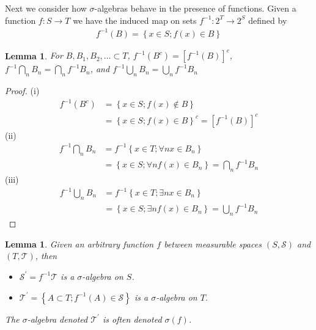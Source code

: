 \documentclass{amsart}
\newtheorem{lem}[thm]{Lemma}
\theoremstyle{remark}
\theoremstyle{definition}
\begin{document}
Next we consider how $\sigma$-algebras behave in the presence of
functions.  Given a function $f:S \to T$ we have the induced map on
sets $f^{-1}: 2^T \to 2^S$ defined by 
\begin{align*}
f^{-1}(B) = \left \{x \in S; f(x) \in B \right \}
\end{align*}
\begin{lem}\label{SetOperationsUnderPullback}For $B,B_1,B_2,\dots \subset T$, $f^{-1}(B^c) = \left[
    f^{-1}(B) \right ]^c$, $f^{-1} \bigcap_n B_n = \bigcap_n f^{-1}
  B_n$, and $f^{-1} \bigcup_n B_n = \bigcup_n f^{-1}
  B_n$
\end{lem}
\begin{proof}
(i)\begin{align*}
f^{-1}(B^c) &= \left \{x \in S; f(x) \notin B \right \} \\
&= \left \{x \in S; f(x) \in B \right \}^c = \left[ f^{-1}(B) \right ]^c
\end{align*}
(ii)\begin{align*}
f^{-1} \bigcap_n B_n &= f^{-1} \left \{x \in T ; \forall n x \in B_n
\right \} \\
& = \left \{x \in S; \forall n f(x) \in B_n \right \} = \bigcap_n f^{-1}  B_n
\end{align*}
(iii)\begin{align*}
f^{-1} \bigcup_n B_n &= f^{-1} \left \{x \in T ; \exists n x \in B_n
\right \} \\
& = \left \{x \in S; \exists n f(x) \in B_n \right \} = \bigcup_n f^{-1}  B_n
\end{align*}
\end{proof}
\begin{lem}\label{SigmaAlgebraPullback}Given an arbitrary function $f$ between measurable spaces
  $(S,\mathcal{S})$ and $(T,\mathcal{T})$, then
\begin{itemize}
\item[(i)] $\mathcal{S}^\prime = f^{-1} \mathcal{T}$ is a
  $\sigma$-algebra on $S$.
\item[(ii)] $\mathcal{T}^\prime = \left \{A \subset T ; f^{-1}(A) \in
      \mathcal{S} \right \}$ is a $\sigma$-algebra on $T$.
\end{itemize}
The $\sigma$-algebra denoted $\mathcal{T}^\prime$ is often denoted
$\sigma(f)$.
\end{lem}
\end{document}
